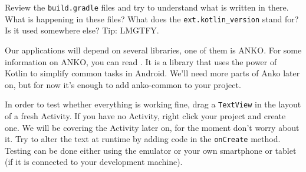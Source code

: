 \begin{exercise}
	Review the \texttt{build.gradle} files and try to understand what is written in there.
	What is happening in these files?
	What does the \texttt{ext.kotlin\_version} stand for?
	Is it used somewhere else? Tip: LMGTFY.
\end{exercise}

 \begin{exercise}
 	Our applications will depend on several libraries, one of them is ANKO.
	For some information on ANKO, you can read \cite{Bukros2017}.
	It is  a library that uses the power of Kotlin to simplify common tasks in Android.
	We’ll need more parts of Anko later on, but for now it’s enough to add anko-common to your project.
 \end{exercise}

\begin{exercise}
	In order to test whether everything is working fine, drag a \texttt{TextView} in the layout of a fresh Activity.
	If you have no Activity, right click your project and create one.
	We will be covering the Activity later on, for the moment don't worry about it.
	Try to alter the text at runtime by adding code in the \texttt{onCreate} method.
	Testing can be done either using the emulator or your own smartphone or tablet (if it is connected to your development machine).
\end{exercise}
